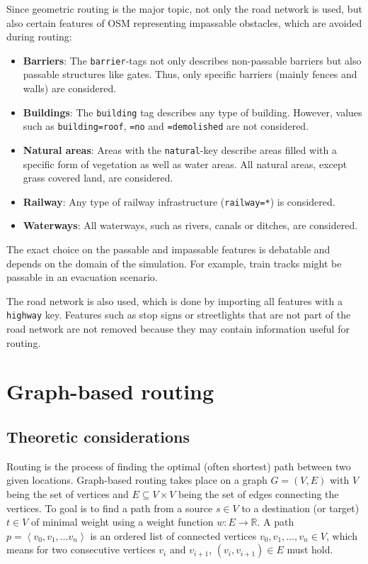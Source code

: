 			Since geometric routing is the major topic, not only the road network is used, but also certain features of OSM representing impassable obstacles, which are avoided during routing:
			\begin{itemize}
				\item \textbf{Barriers}: The \texttt{barrier}-tags not only describes non-passable barriers but also passable structures like gates. Thus, only specific barriers (mainly fences and walls) are considered.
				\item \textbf{Buildings}: The \texttt{building} tag describes any type of building. However, values such as \texttt{building=roof}, \texttt{=no} and \texttt{=demolished} are not considered.
				\item \textbf{Natural areas}: Areas with the \texttt{natural}-key describe areas filled with a specific form of vegetation as well as water areas. All natural areas, except grass covered land, are considered.
				\item \textbf{Railway}: Any type of railway infrastructure (\texttt{railway=*}) is considered.
				\item \textbf{Waterways}: All waterways, such as rivers, canals or ditches, are considered.
			\end{itemize}
			The exact choice on the passable and impassable features is debatable and depends on the domain of the simulation.
			For example, train tracks might be passable in an evacuation scenario.
			
			The road network is also used, which is done by importing all features with a \texttt{highway} key.
			Features such as stop signs or streetlights that are not part of the road network are not removed because they may contain information useful for routing.

\section{Graph-based routing}
\label{sec:graph-routing}

	\subsection{Theoretic considerations}
	\label{subsec:routing-theoretic-considerations}	
	
		Routing is the process of finding the optimal (often shortest) path between two given locations.
		Graph-based routing takes place on a graph $G=(V, E)$ with $V$ being the set of vertices and $E \subseteq V \times V$ being the set of edges connecting the vertices\cite[643-644]{cormen-introduction-to-alg}.
		To goal is to find a path from a source $s \in V$ to a destination (or target) $t \in V$ of minimal weight using a weight function $w: E \rightarrow \mathbb{R}$.
		A path $p=\left\langle v_0, v_1, \dots v_n \right\rangle$ is an ordered list of connected vertices $v_0, v_1, \dots, v_n \in V$, which means for two consecutive vertices $v_i$ and $v_{i+1}$, $(v_i, v_{i+1}) \in E$ must hold.
		
